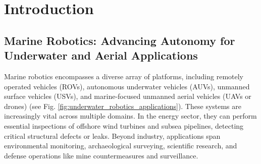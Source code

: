 \chapter{Introduction}















\section{Marine Robotics: Advancing Autonomy for Underwater and Aerial Applications}

Marine robotics encompasses a diverse array of platforms, including remotely operated vehicles (ROVs), autonomous underwater vehicles (AUVs), unmanned surface vehicles (USVs), and marine-focused unmanned aerial vehicles (UAVs or drones) (see Fig. \ref{fig:underwater_robotics_applications}). These systems are increasingly vital across multiple domains. In the energy sector, they can perform essential inspections of offshore wind turbines and subsea pipelines, detecting critical structural defects or leaks. Beyond industry, applications span environmental monitoring, archaeological surveying, scientific research, and defense operations like mine countermeasures and surveillance.


